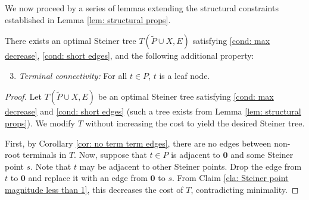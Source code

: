 \documentclass{theoretics}
\newcommand{\1}{\textbf{1}}
\renewcommand{\tilde}{\widetilde}
\begin{document}
We now proceed by a series of lemmas extending the structural constraints established in Lemma \ref{lem: structural props}.
\begin{lemma} \label{lem: term leaf node}
There exists an optimal Steiner tree $T(\tilde{P} \cup X, E)$ satisfying \ref{cond: max decrease}, \ref{cond: short edges}, and the following additional property:
\begin{enumerate}[label=(P\arabic*)]
\setcounter{enumi}{2}
\item \textit{Terminal connectivity:} For all $t \in P$, $t$ is a leaf node. \label{cond: term leaf node}
\end{enumerate}
\end{lemma}
\begin{proof}
Let $T(\tilde{P} \cup X, E)$ be an optimal Steiner tree satisfying \ref{cond: max decrease} and \ref{cond: short edges} (such a tree exists from Lemma \ref{lem: structural props}).  We modify $T$ without increasing the cost to yield the desired Steiner tree. 

First, by Corollary \ref{cor: no term term edges}, there are no edges between non-root terminals in $T$. Now, suppose that $t \in P$ is adjacent to $\mathbf{0}$ and some Steiner point $s$. Note that $t$ may be adjacent to other Steiner points. Drop the edge from $t$ to $\mathbf{0}$ and replace it with an edge from $\mathbf{0}$ to $s$. From Claim \ref{cla: Steiner point magnitude less than 1}, this decreases the cost of $T$, contradicting minimality. 


\end{proof}
\end{document}
